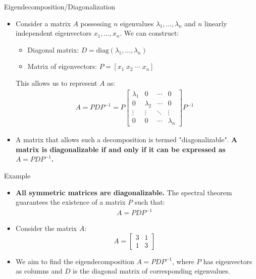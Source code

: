 \begin{frame}{Eigendecomposition/Diagonalization}
    \begin{itemize}
        \item Consider a matrix $A$ possessing $n$ eigenvalues $\lambda_1, \ldots, \lambda_n$ and $n$ linearly independent eigenvectors $x_1, \ldots, x_n$. We can construct:
        \begin{itemize}
            \item Diagonal matrix: $D=\text{diag}(\lambda_1, \ldots, \lambda_n)$
            \item Matrix of eigenvectors: $P=[x_1 \; x_2 \; \cdots \; x_n]$
        \end{itemize}
        This allows us to represent $A$ as:
         \begin{align}
         A=P D P^{-1} =  P \begin{bmatrix}
        \lambda_1 & 0 & \cdots & 0 \\
        0 & \lambda_2 & \cdots & 0 \\
        \vdots & \vdots & \ddots & \vdots \\
        0 & 0 & \cdots & \lambda_n
        \end{bmatrix} P^{-1}
         \end{align}
         \item A matrix that allows such a decomposition is termed "diagonalizable". \textbf{A matrix is diagonalizable if and only if it can be expressed as $A = PDP^{-1}$.}
     \end{itemize}
    \end{frame}
    \begin{frame}{Example}
    \begin{itemize}
         \item \textbf{All symmetric matrices are diagonalizable.} The spectral theorem guarantees the existence of a matrix $P$ such that:
        \begin{align}
            A= PDP^{-1} \label{eqbon2,2}
        \end{align}
        \item Consider the matrix $A$:
        \[
        A = \begin{bmatrix}
        3 & 1 \\
        1 & 3
        \end{bmatrix}
        \]
        \item We aim to find the eigendecomposition $A = P DP^{-1}$, where $P$ has eigenvectors as columns and $D$ is the diagonal matrix of corresponding eigenvalues.
    \end{itemize}
    \end{frame}


